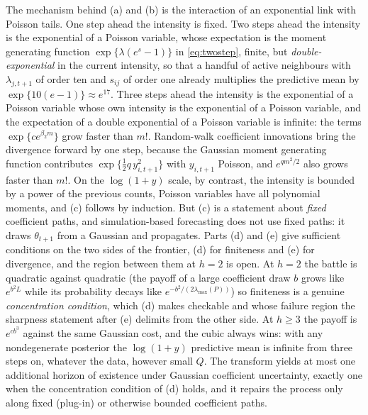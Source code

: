 \documentclass[12pt]{article}
\theoremstyle{plain}
\theoremstyle{definition}
\theoremstyle{remark}
\begin{document}
The mechanism behind (a) and (b) is the interaction of an exponential link with Poisson tails. One step ahead the intensity is fixed. Two steps ahead the intensity is the exponential of a Poisson variable, whose expectation is the moment generating function $\exp\{\lambda(e^{s}-1)\}$ in \eqref{eq:twostep}, finite, but \emph{double-exponential} in the current intensity, so that a handful of active neighbours with $\lambda_{j,t+1}$ of order ten and $s_{ij}$ of order one already multiplies the predictive mean by $\exp\{10(e-1)\}\approx e^{17}$. Three steps ahead the intensity is the exponential of a Poisson variable whose own intensity is the exponential of a Poisson variable, and the expectation of a double exponential of a Poisson variable is infinite: the terms $\exp\{ce^{\beta_2 m}\}$ grow faster than $m!$. Random-walk coefficient innovations bring the divergence forward by one step, because the Gaussian moment generating function contributes $\exp\{\tfrac12 q\,y_{i,t+1}^2\}$ with $y_{i,t+1}$ Poisson, and $e^{qm^2/2}$ also grows faster than $m!$. On the $\log(1+y)$ scale, by contrast, the intensity is bounded by a power of the previous counts, Poisson variables have all polynomial moments, and (c) follows by induction. But (c) is a statement about \emph{fixed} coefficient paths, and simulation-based forecasting does not use fixed paths: it draws $\theta_{t+1}$ from a Gaussian and propagates. Parts (d) and (e) give sufficient conditions on the two sides of the frontier, (d) for finiteness and (e) for divergence, and the region between them at $h=2$ is open. At $h=2$ the battle is quadratic against quadratic (the payoff of a large coefficient draw $b$ grows like $e^{b^2L}$ while its probability decays like $e^{-b^2/(2\lambda_{\max}(P))}$) so finiteness is a genuine \emph{concentration condition}, which (d) makes checkable and whose failure region the sharpness statement after (e) delimits from the other side. At $h\ge3$ the payoff is $e^{cb^3}$ against the same Gaussian cost, and the cubic always wins: with any nondegenerate posterior the $\log(1+y)$ predictive mean is infinite from three steps on, whatever the data, however small $Q$. The transform yields at most one additional horizon of existence under Gaussian coefficient uncertainty, exactly one when the concentration condition of (d) holds, and it repairs the process only along fixed (plug-in) or otherwise bounded coefficient paths.
\end{document}
